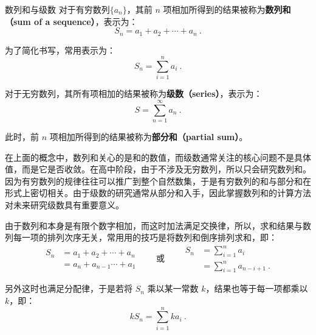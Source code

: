 \begin{definition}{数列和与级数}
对于有穷数列$\{a_n\}$，其前 $n$ 项相加所得到的结果被称为\textbf{数列和（sum of a sequence）}，表示为：
\begin{equation}
S_n = a_1 + a_2 + \cdots + a_n~.
\end{equation}

为了简化书写，常用表示为：
\begin{equation}
S_n = \sum_{i=1}^n a_i~.
\end{equation}

对于无穷数列，其所有项相加的结果被称为\textbf{级数（series）}，表示为：
\begin{equation}
S = \sum_{n=1}^\infty a_n~.
\end{equation}

此时，前 $n$ 项相加所得到的结果被称为\textbf{部分和（partial sum）}。
\end{definition}

在上面的概念中，数列和关心的是和的数值，而级数通常关注的核心问题不是具体值，而是它是否收敛。在高中阶段，由于不涉及无穷数列，所以只会研究数列和。因为有穷数列的规律往往可以推广到整个自然数集，于是有穷数列的和与部分和在形式上密切相关。由于级数的研究通常从部分和入手，因此掌握数列和的计算方法对未来研究级数具有重要意义。

由于数列和本身是有限个数字相加，而这时加法满足交换律，所以，求和结果与数列每一项的排列次序无关，常用用的技巧是将数列和倒序排列求和，即：
\begin{equation}
\begin{split}
S_n&=a_1 + a_2 + \cdots + a_n\\
&=a_n+a_{n-1} \cdots +a_1
\end{split}
\qquad\text{或}\qquad
\begin{split}
S_n&=\sum_{i=1}^n a_i\\
&=\sum_{i=1}^n a_{n-i+1}~.
\end{split}
\end{equation}

另外这时也满足分配律，于是若将 $S_n$ 乘以某一常数 $k$，结果也等于每一项都乘以 $k$，即：
\begin{equation}
kS_n=\sum_{i=1}^n ka_i~.
\end{equation}

